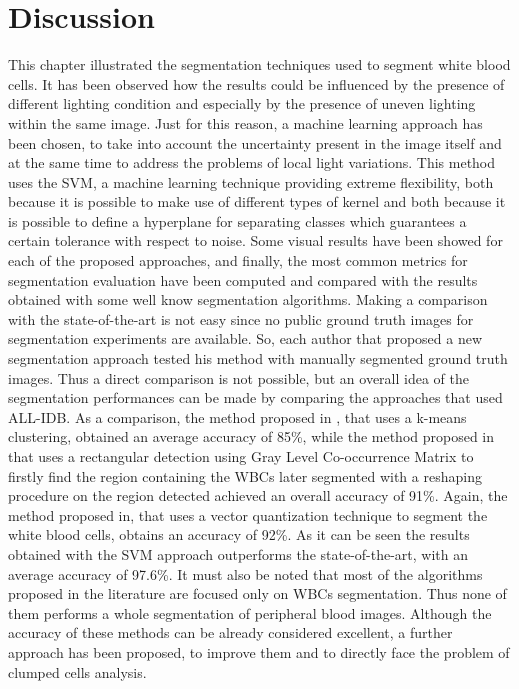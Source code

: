 \documentclass[final,a4paper,12pt,english]{UnicaPhdThesis3}
\begin{document}
{\section{Discussion}
\label{sec:Discussion}
This chapter illustrated the segmentation techniques used to segment white blood cells.
It has been observed how the results could be influenced by the presence of different lighting condition and especially by the presence of uneven lighting within the same image. Just for this reason, a machine learning approach has been chosen, to take into account the uncertainty present in the image itself and at the same time to address the problems of local light variations. This method uses the SVM, a machine learning technique providing extreme flexibility, both because it is possible to make use of different types of kernel and both because it is possible to define a hyperplane for separating classes which guarantees a certain tolerance with respect to noise. Some visual results have been showed for each of the proposed approaches, and finally, the most common metrics for segmentation evaluation have been computed and compared with the results obtained with some well know segmentation algorithms. Making a comparison with the state-of-the-art is not easy since no public ground truth images for segmentation experiments are available. So, each author that proposed a new segmentation approach tested his method with manually segmented ground truth images. Thus a direct comparison is not possible, but an overall idea of the segmentation performances can be made by comparing the approaches that used ALL-IDB. As a comparison, the method proposed in \cite{Rawat}, that uses a k-means clustering, obtained an average accuracy of 85\%, while the method proposed in \cite{Alilou} that uses a rectangular detection using Gray Level Co-occurrence Matrix to firstly find the region containing the WBCs later segmented with a reshaping procedure on the region detected achieved an overall accuracy of 91\%. Again, the method proposed in\cite{Kekre}, that uses a vector quantization technique to segment the white blood cells, obtains an accuracy of 92\%. As it can be seen the results obtained with the SVM approach outperforms the state-of-the-art, with an average accuracy of 97.6\%. It must also be noted that most of the algorithms proposed in the literature are focused only on WBCs segmentation. Thus none of them performs a whole segmentation of peripheral blood images.
Although the accuracy of these methods can be already considered excellent, a further approach has been proposed, to improve them and to directly face the problem of clumped cells analysis.
}
\end{document}
